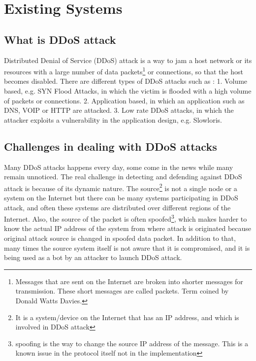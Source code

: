 \documentclass[12pt,oneside,a4paper]{article}
\begin{document}

\doublespacing
\renewcommand{\thepage}{\roman{page}}%
\setcounter{page}{2}%

\tableofcontents
\newpage
\pagestyle{myheadings}

\pagebreak
\renewcommand{\thepage}{\arabic{page}}%

\section{Existing Systems}

\subsection{What is DDoS attack}
Distributed Denial of Service (DDoS) attack is a way to jam a host network or its resources with a large number of data packets\footnote{Messages that are sent on the Internet are broken into shorter messages for transmission. These short messages are called packets. Term coined by Donald Watts Davies.} \cite{network-data-packet} or connections, so that the host becomes disabled. There are different types of DDoS attacks such as :
1. Volume based, e.g. SYN Flood Attacks, in which the victim is flooded with a high volume of packets or connections.
2. Application based, in which an application such as DNS, VOIP or HTTP are attacked.
3. Low rate DDoS attacks, in which the attacker exploits a vulnerability in the application design, e.g. Slowloris.
\cite{DDoS-attacks}

\subsection{Challenges in dealing with DDoS attacks}
Many DDoS attacks happens every day\cite{ddos-attack-news}, some come in the news while many remain unnoticed. The real challenge in detecting and defending against DDoS attack is because of its dynamic nature. The source\footnote{It is a system/device on the Internet that has an IP address, and which is involved in DDoS attack} is not a single node or a system on the Internet but there can be many systems participating in DDoS attack, and often these systems are distributed over different regions of the Internet. Also, the source of the packet is often spoofed\footnote{spoofing is the way to change the source IP address of the message. This is a known issue in the protocol itself not in the implementation}\cite{ip-spoofing}, which makes harder to know the actual IP address of the system from where attack is originated because original attack source is changed in spoofed data packet. In addition to that, many times the source system itself is not aware that it is compromised, and it is being used as a bot\cite{bot} by an attacker to launch DDoS attack.
\end{document}
